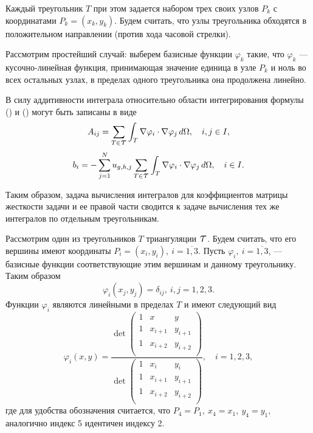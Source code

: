 \documentclass[12pt, a4paper]{article}
\renewcommand{\phi}{\varphi}
\newcommand\Tau{\scalerel*{\tau}{T}}
\begin{document}
				Каждый треугольник $T$ при этом задается набором трех своих узлов $P_k$ с координатами $P_k = (x_k, y_k)$. Будем считать, что узлы треугольника обходятся в положительном направлении (против хода часовой стрелки).
				
				Рассмотрим простейший случай: выберем базисные функции $\phi_k$ такие, что $\phi_k$ --- кусочно-линейная функция, принимающая значение единица в узле $P_k$ и ноль во всех остальных узлах, в пределах одного треугольника она продолжена линейно.
				
				В силу аддитивности интеграла относительно области интегрирования  формулы () и () могут быть записаны в виде			
				\begin{equation}
					A_{ij} = \sum_{T \in \Tau}\int_{T} \nabla \phi_i \cdot \nabla \phi_j \, d\Omega,
					\quad i, j\in I,
					\label{A_stiff_second}				
				\end{equation}
				\begin{equation}
					b_i = - \sum_{j=1}^{N} u_{g,h, j} \sum_{T \in \Tau} \int_{T} \nabla \phi_i  \cdot \nabla \phi_j \, d\Omega, \quad i \in I.
					\label{b_stiff_second}
				\end{equation}
				
				Таким образом, задача вычисления интегралов для коэффициентов матрицы жесткости задачи и ее правой части сводится к задаче вычисления тех же интегралов по отдельным треугольникам.
				
				
				Рассмотрим один из треугольников $T$ триангуляции $\Tau$. Будем считать, что его вершины имеют координаты  $P_i = (x_i, y_i), \ i=\overline{1,3}$. Пусть $\phi_i, \ i=\overline{1,3}$, --- базисные функции соответствующие этим вершинам и данному треугольнику. Таким образом 
				\begin{equation*}
					\phi_i(x_j, y_j) = \delta_{ij}, \ i,j = 1,2,3.
				\end{equation*}
				Функции $\phi_i$ являются линейными в пределах $T$ и имеют следующий вид
				\begin{equation}
					\phi_i(x,y) = 
					\dfrac{
						\det{
							\begin{pmatrix}
								1 & x & y \\
								1 & x_{i+1} & y_{i+1} \\
								1 & x_{i+2} & y_{i+2} \\							
							 \end{pmatrix}
						 }
					}{
					\det{
						\begin{pmatrix}
							1 & x_{i} & y_{i} \\
							1 & x_{i+1} & y_{i+1} \\
							1 & x_{i+2} & y_{i+2} \\							
						\end{pmatrix}
						}
					}, \quad i = 1,2,3,
					\label{basis_fun_phi}
				\end{equation}
				где для удобства обозначения считается, что $P_4 = P_1, \ x_4 = x_1, \ y_4 = y_1, $ аналогично индекс 5 идентичен индексу 2.
				
\end{document}
